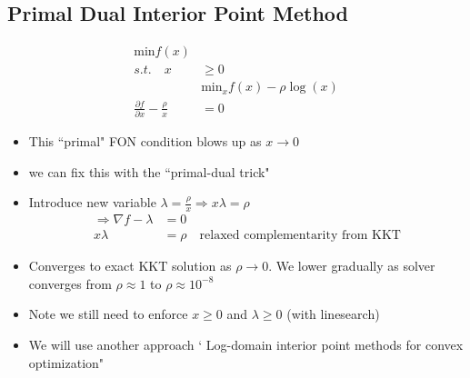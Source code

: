 \documentclass[11pt]{article}
\begin{document}
\subsection{Primal Dual Interior Point Method}
\begin{align*}
    \text{min} f(x) \\
    s.t. \quad x&\geq 0
    \\
    &\text{min}_x f(x) - \rho \log(x) 
    \\
    \frac{\partial f}{\partial x} - \frac{\rho}{x} &= 0
\end{align*}
\begin{itemize}
    \item This ``primal" FON condition blows up as $x\rightarrow 0$
    \item we can fix this with the ``primal-dual trick"
    \item Introduce new variable $\lambda=\frac{\rho}{x}\Rightarrow x\lambda = \rho$
    \begin{align*}
        \Rightarrow \nabla f - \lambda &= 0
        \\
        x\lambda &= \rho \quad \text{relaxed complementarity from KKT}
    \end{align*}
    \item Converges to exact KKT solution as $\rho\rightarrow0$. We lower gradually as solver converges from $\rho\approx1$ to $\rho\approx 10^{-8}$
    \item Note we still need to enforce $x\geq 0$ and $\lambda\geq0$ (with linesearch)
    \item We will use another approach ` Log-domain interior point methods for convex optimization"
\end{itemize}
\end{document}
